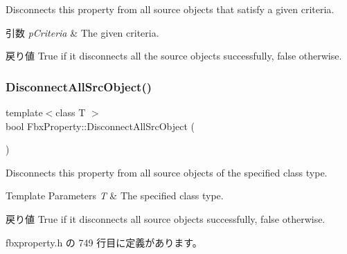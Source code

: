 Disconnects this property from all source objects that satisfy a given criteria. 
\begin{DoxyParams}{引数}
{\em p\+Criteria} & The given criteria. \\
\hline
\end{DoxyParams}
\begin{DoxyReturn}{戻り値}
{\ttfamily True} if it disconnects all the source objects successfully, {\ttfamily false} otherwise. 
\end{DoxyReturn}
\mbox{\label{class_fbx_property_a70f1adf2711c5bd6f3d7c1f6f9c7ddf2}} 
\subsubsection{\texorpdfstring{Disconnect\+All\+Src\+Object()}{DisconnectAllSrcObject()}\hspace{0.1cm}{\footnotesize\ttfamily [3/4]}}
{\footnotesize\ttfamily template$<$class T $>$ \\
bool Fbx\+Property\+::\+Disconnect\+All\+Src\+Object (\begin{DoxyParamCaption}{ }\end{DoxyParamCaption})\hspace{0.3cm}{\ttfamily [inline]}}

Disconnects this property from all source objects of the specified class type. 
\begin{DoxyTemplParams}{Template Parameters}
{\em T} & The specified class type. \\
\hline
\end{DoxyTemplParams}
\begin{DoxyReturn}{戻り値}
{\ttfamily True} if it disconnects all source objects successfully, {\ttfamily false} otherwise. 
\end{DoxyReturn}


 fbxproperty.\+h の 749 行目に定義があります。

\mbox{\label{class_fbx_property_ab176817ac3ddc88c86d28006b066bc26}} 
